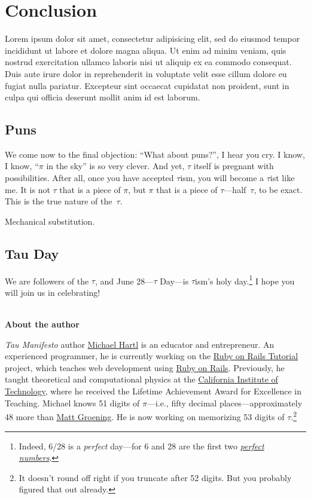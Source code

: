 \documentclass{article}
\begin{document}

\section{Conclusion}

Lorem ipsum dolor sit amet, consectetur adipisicing elit, sed do eiusmod tempor incididunt ut labore et dolore magna aliqua. Ut enim ad minim veniam, quis nostrud exercitation ullamco laboris nisi ut aliquip ex ea commodo consequat. Duis aute irure dolor in reprehenderit in voluptate velit esse cillum dolore eu fugiat nulla pariatur. Excepteur sint occaecat cupidatat non proident, sunt in culpa qui officia deserunt mollit anim id est laborum.

\subsection{Puns}

We come now to the final objection: ``What about puns?'', I hear you cry. I know, I know, ``$\pi$ in the sky'' is so very clever. And yet, $\tau$ itself is pregnant with possibilities. After all, once you have accepted $\tau$ism, you will become a $\tau$ist like me. It is not $\tau$ that is a piece of $\pi$, but $\pi$ that is a piece of $\tau$---half~$\tau$, to be exact. This is the true nature of the~$\tau$.

Mechanical substitution.

\subsection{Tau Day} %
\label{sec:tau_day}


We are followers of the $\tau$, and June 28---$\tau$ Day---is $\tau$ism's holy day.\footnote{Indeed, 6/28 is a \emph{perfect} day---for 6 and 28 are the first two \href{http://en.wikipedia.org/wiki/Perfect_number}{\emph{perfect numbers}}.} I hope you will join us in celebrating!

\\

\textbf{About the author}

\emph{Tau Manifesto} author \href{http://www.michaelhartl.com/}{Michael Hartl} is an educator and entrepreneur. An experienced programmer, he is currently working on the  \href{http://www.railstutorial.org/}{Ruby on Rails Tutorial} project, which teaches web development using \href{http://www.rubyonrails.org/}{Ruby on Rails}. Previously, he taught theoretical and computational physics at the \href{http://www.caltech.edu/}{California Institute of Technology}, where he received the Lifetime Achievement Award for Excellence in Teaching. Michael knows 51 digits of $\pi$---i.e., fifty decimal places---approximately 48 more than \href{http://en.wikipedia.org/wiki/Matt_Groening}{Matt Groening}. He is now working on memorizing 53 digits of $\tau$.\footnote{It doesn't round off right if you truncate after 52 digits. But you probably figured that out already.}
\end{document}
